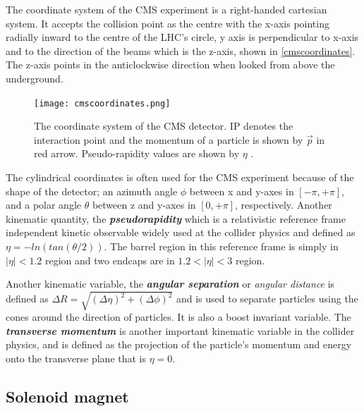 The coordinate system of the CMS experiment is a right-handed cartesian system. It accepts the collision point as the centre with the x-axis pointing radially inward to the centre of the LHC's circle, y axis is perpendicular to x-axis and to the direction of the beams which is the z-axis, shown in \autoref{cmscoordinates}. The z-axis points in the anticlockwise direction when looked from above the underground. 

\begin{figure}[ht]
	\centering
	\texttt{[image: cmscoordinates.png]}
	\vspace{2mm}
	\caption[The coordinate system of the CMS detector. IP denotes the interaction point and the momentum of a particle is shown by $\vec{p}$ in red arrow. Pseudo-rapidity values are shown by $\eta$.]{The coordinate system of the CMS detector. IP denotes the interaction point and the momentum of a particle is shown by $\vec{p}$ in red arrow. Pseudo-rapidity values are shown by $\eta$ \cite{cmscoordinates}.}
	\label{cmscoordinates}
\end{figure}

The cylindrical coordinates is often used for the CMS experiment because of the shape of the detector; an azimuth angle $\phi$ between x and y-axes in $\left[-\pi,+\pi\right]$, and a polar angle $\theta$ between z and y-axes in $\left[0,+\pi\right]$, respectively. Another kinematic quantity, the \textbf{\emph{pseudorapidity}} which is a relativistic reference frame independent kinetic observable widely used at the collider physics and defined as $\eta = -ln\left(tan\left(\theta/2\right)\right)$. The barrel region in this reference frame is simply in $|\eta|<1.2$ region and two endcaps are in $1.2<|\eta|<3$ region.

Another kinematic variable, the \textbf{\emph{angular separation}} or \emph{angular distance} is defined as $\Delta R = \sqrt{\left(\Delta\eta\right)^2 + \left(\Delta\phi\right)^2}$ and is used to separate particles using the cones around the direction of particles. It is also a boost invariant variable. The \textbf{\emph{transverse momentum}} \pt is another important kinematic variable in the collider physics, and is defined as the projection of the particle's momentum and energy onto the transverse plane that is $\eta = 0$.

\subsection{Solenoid magnet}

